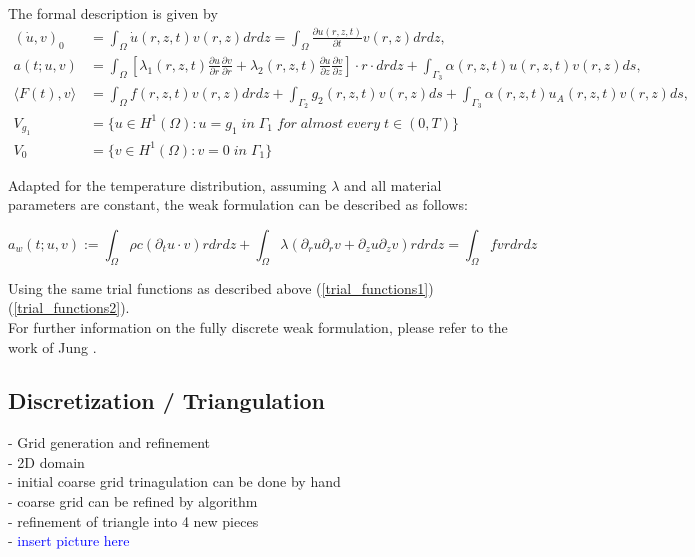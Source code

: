 \documentclass[parskip=half, titlepage=yes, 12pt, BCOR=12mm, DIV=calc]{scrartcl}
\begin{document}
The formal description is given by 
\begin{align*}
    (\Dot{u},v)_0 &= \int_{\Omega} \Dot{u}(r,z,t)v(r,z) drdz = \int_{\Omega} \frac{\partial u(r,z,t)}{\partial t} v(r,z) drdz, \\
    a(t;u,v) &= \int_{\Omega} \left[ \lambda_1(r,z,t) \frac{\partial u}{\partial r} \frac{\partial v}{\partial r} + \lambda_2(r,z,t) \frac{\partial u}{\partial z} \frac{\partial v}{\partial z} \right] \cdot r \cdot drdz + \int_{\Gamma_3} \alpha(r,z,t)u(r,z,t)v(r,z) ds, \\
    \langle F(t),v \rangle &= \int_{\Omega} f(r,z,t)v(r,z) drdz + \int_{\Gamma_2} g_2(r,z,t)v(r,z) ds + \int_{\Gamma_3} \alpha(r,z,t)u_A(r,z,t)v(r,z) ds, \\
    V_{g_1} &= \{u \in H^1(\Omega) : u = g_1 \; in \;  \Gamma_1 \; for \; almost \; every \; t \in (0,T) \} \\
    V_0 &= \{ v \in H^1(\Omega) : v = 0 \; in \; \Gamma_1 \}
\end{align*}

Adapted for the temperature distribution, assuming $\lambda$ and all material parameters are constant, the weak formulation can be described as follows: 

\begin{equation}
    a_w(t;u,v) := \int_{\Omega} \rho c (\partial_t u \cdot v) r drdz + \int_{\Omega} \lambda (\partial_r u \partial_r v + \partial_z u \partial_z v) r drdz = \int_{\Omega} f v r dr dz
\end{equation}

Using the same trial functions as described above (\ref{trial_functions1}) (\ref{trial_functions2}).  \\

For further information on the fully discrete weak formulation, please refer to the work of Jung \cite{jung}.


\subsection{Discretization / Triangulation}

- Grid generation and refinement \\
- 2D domain \\
- initial coarse grid trinagulation can be done by hand \\
- coarse grid can be refined by algorithm \\

- refinement of triangle into 4 new pieces \\
- \textcolor{blue}{insert picture here}
\end{document}
